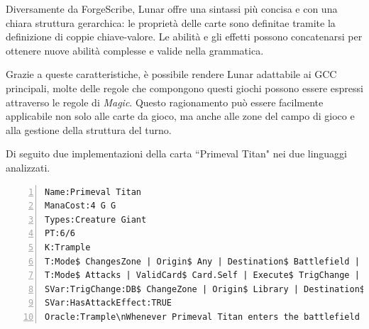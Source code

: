 Diversamente da ForgeScribe, Lunar offre una sintassi più concisa e con una chiara struttura gerarchica: le proprietà delle carte sono definitae tramite la definizione di coppie chiave-valore. Le abilità e gli effetti possono concatenarsi per ottenere nuove abilità complesse e valide nella grammatica.

Grazie a queste caratteristiche, è possibile rendere Lunar adattabile ai GCC principali, molte delle regole che compongono questi giochi possono essere espressi attraverso le regole di \emph{Magic}. Questo ragionamento può essere facilmente applicabile non solo alle carte da gioco, ma anche alle zone del campo di gioco e alla gestione della struttura del turno.\newline

Di seguito due implementazioni della carta ``Primeval Titan" nei due linguaggi analizzati.


\begin{algorithm}[!ht]
	\caption{Esempio della carta in Figura \ref{fig:one} in ForgeScript}
	\label{lst:prime_titan_fs}
    \footnotesize
	\begin{Verbatim}[numbers=left,breaklines]
Name:Primeval Titan
ManaCost:4 G G
Types:Creature Giant
PT:6/6
K:Trample
T:Mode$ ChangesZone | Origin$ Any | Destination$ Battlefield | ValidCard$ Card.Self | Execute$ TrigChange | OptionalDecider$ You | TriggerDescription$ Whenever CARDNAME enters the battlefield or attacks, you may search your library for up to two land cards, put them onto the battlefield tapped, then shuffle.
T:Mode$ Attacks | ValidCard$ Card.Self | Execute$ TrigChange | TriggerZones$ Battlefield | OptionalDecider$ You | Secondary$ True | TriggerDescription$ Whenever CARDNAME enters the battlefield or attacks, you may search your library for up to two land cards, put them onto the battlefield tapped, then shuffle.
SVar:TrigChange:DB$ ChangeZone | Origin$ Library | Destination$ Battlefield | Tapped$ True | ChangeType$ Land | ChangeNum$ 2 | ShuffleNonMandatory$ True
SVar:HasAttackEffect:TRUE
Oracle:Trample\nWhenever Primeval Titan enters the battlefield or attacks, you may search your library for up to two land cards, put them onto the battlefield tapped, then shuffle. 
	\end{Verbatim}
\end{algorithm}



